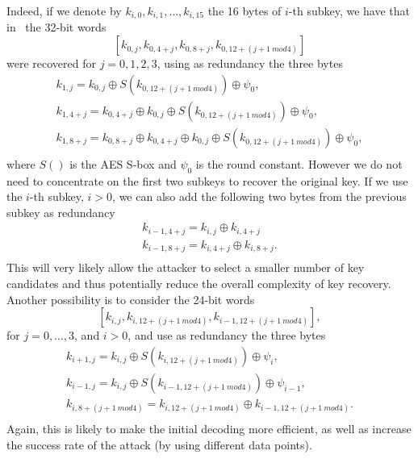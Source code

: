 Indeed, if we denote by $k_{i,0}, k_{i,1}, 
\ldots , k_{i,15}$ the 16 bytes of $i$-th subkey, we have that in~\cite{coldboot08} the 32-bit words 
$$[k_{0,j}, k_{0,4+j}, k_{0,8+j}, k_{0,12 + (j+1 \ mod 4)}]$$
were recovered for $j=0,1,2,3$, using as redundancy the three bytes 
$$
\begin{array}{l}
k_{1,j} = k_{0, j} \oplus S(k_{0,12 + (j+1 \ mod 4)}) \oplus \psi_0,\\
k_{1,4+j} = k_{0, 4+ j} \oplus k_{0, j} \oplus S(k_{0,12 + (j+1 \ mod 4)}) \oplus \psi_0,\\
k_{1,8+j} = k_{0,8+j} \oplus k_{0, 4+ j} \oplus k_{0, j} \oplus S(k_{0,12 + (j+1 \ mod 4)}) \oplus \psi_0,\\
\end{array}
$$
where $S()$ is the AES S-box and $\psi_0$ is the round constant. However we do not need to concentrate on the first two subkeys to recover the original key. If we use the $i$-th subkey, $i>0$, we can also add
the following two bytes from the previous subkey as redundancy
$$
\begin{array}{l}
k_{i-1,4+j} = k_{i,j} \oplus k_{i,4+j} \\
k_{i-1,8+j} = k_{i,4+j} \oplus k_{i,8+j}. \\
\end{array}
$$
This will very likely allow the attacker to select a smaller number of key candidates and thus potentially reduce the overall complexity of key recovery. Another possibility is to consider the 24-bit words
$$
[k_{i,j}, k_{i,12 + (j+1 \ mod 4)}, k_{i-1,12 + (j+1 \ mod 4)}],
$$
for $j=0, \dots ,3$, and $i>0$, and use as redundancy the three bytes
$$
\begin{array}{l}
k_{i+1,j} = k_{i, j} \oplus S(k_{i,12 + (j+1 \ mod 4)}) \oplus \psi_i,\\
k_{i-1,j} = k_{i, j} \oplus S(k_{i-1,12 + (j+1 \ mod 4)}) \oplus \psi_{i-1},\\
k_{i, 8 + (j+1 \ mod 4)} = k_{i,12 + (j+1 \ mod 4)} \oplus k_{i-1,12 + (j+1 \ mod 4)}.\\
\end{array}
$$
Again, this is likely to make the initial decoding more efficient, as well as increase the success rate of the attack (by using different data points).

